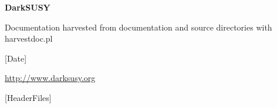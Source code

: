 \documentclass[a4paper,10pt,oneside]{book}
\begin{document}
\centerline{}

\vspace{2cm}

\centerline{\LARGE \bfseries DarkSUSY \detokenize{[DarkSUSYVersion]}}

\bigskip
\bigskip

\centerline{\Huge \bfseries \sffamily [Title]}

\smallskip
\centerline{\Large \bfseries \sffamily [SubTitle]}
\smallskip

\vspace{1.5cm}

\centerline{\large Documentation harvested from documentation and source directories with harvestdoc.pl}
\smallskip

\centerline{[Date]}

\bigskip

\centerline{\url{http://www.darksusy.org}}

\bigskip

[HeaderFiles]

\newpage

\tableofcontents

 
\end{document}
